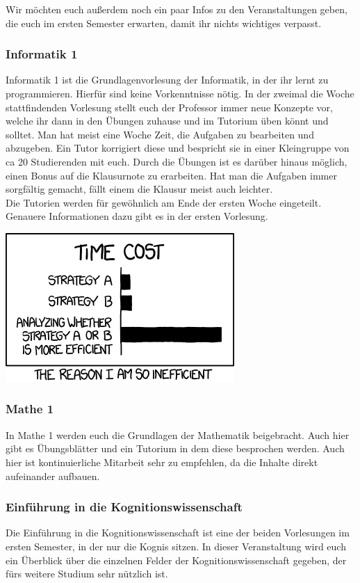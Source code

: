 Wir möchten euch außerdem noch ein paar Infos zu den Veranstaltungen geben, die euch im ersten Semester erwarten, damit ihr nichts wichtiges verpasst.

\subsubsection*{Informatik 1}
Informatik 1 ist die Grundlagenvorlesung der Informatik, in der ihr lernt zu programmieren. Hierfür sind keine Vorkenntnisse nötig. In der zweimal die Woche stattfindenden Vorlesung stellt euch der Professor immer neue Konzepte vor, welche ihr dann in den Übungen zuhause und im Tutorium üben könnt und solltet. Man hat meist eine Woche Zeit, die Aufgaben zu bearbeiten und abzugeben. Ein Tutor korrigiert diese und bespricht sie in einer Kleingruppe von ca 20 Studierenden mit euch. Durch die Übungen ist es darüber hinaus möglich, einen Bonus auf die Klausurnote zu erarbeiten. Hat man die Aufgaben immer sorgfältig gemacht, fällt einem die Klausur meist auch leichter.\\
Die Tutorien werden für gewöhnlich am Ende der ersten Woche eingeteilt. Genauere Informationen dazu gibt es in der ersten Vorlesung.

\begin{center}
\includegraphics[width=0.5\hsize]{info/xkcd/efficiency.png}
\end{center}

\subsubsection*{Mathe 1}
In Mathe 1 werden euch die Grundlagen der Mathematik beigebracht. Auch hier gibt es Übungsblätter und ein Tutorium in dem diese besprochen werden. Auch hier ist kontinuierliche Mitarbeit sehr zu empfehlen, da die Inhalte direkt aufeinander aufbauen.

\subsubsection*{Einführung in die Kognitionswissenschaft}
Die Einführung in die Kognitionswissenschaft ist eine der beiden Vorlesungen im ersten Semester, in der nur die Kognis sitzen. In dieser Veranstaltung wird euch ein Überblick über die einzelnen Felder der Kognitionswissenschaft gegeben, der fürs weitere Studium sehr nützlich ist.

